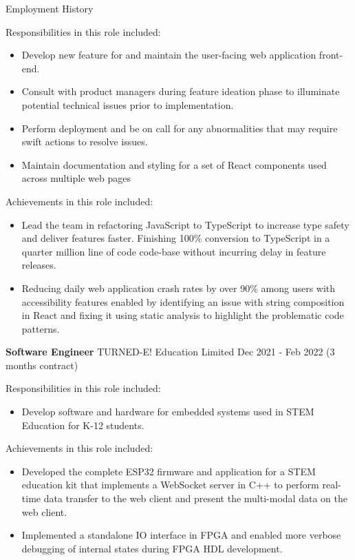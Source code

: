 \documentclass{resume} %
\begin{document}
\begin{rSection}{Employment History}
\begin{minipage}{.8\textwidth}
        Responsibilities in this role included:
        \begin{itemize}
            \item Develop new feature for and maintain the user-facing web application front-end.
            \item Consult with product managers during feature ideation phase to illuminate potential technical issues prior to implementation.
            \item Perform deployment and be on call for any abnormalities that may require swift actions to resolve issues.
            \item Maintain documentation and styling for a set of React components used across multiple web pages
        \end{itemize}
        
        Achievements in this role included:
        \begin{itemize}
            \item Lead the team in refactoring JavaScript to TypeScript to increase type safety and deliver features faster. Finishing 100\% conversion to TypeScript in a quarter million line of code code-base without incurring delay in feature releases.
            \item Reducing daily web application crash rates by over 90\% among users with accessibility features enabled by identifying an issue with string composition in React and fixing it using static analysis to highlight the problematic code patterns.
        \end{itemize}
    \end{minipage}%
    
    \item \textbf{Software Engineer} {TURNED-E! Education Limited} \hfill Dec 2021 - Feb 2022 (3 months contract) \\
    
    \hspace*{1cm}%
    \begin{minipage}{.8\textwidth}%
        
        Responsibilities in this role included:
        \begin{itemize}
            \item Develop software and hardware for embedded systems used in STEM Education for K-12 students.
        \end{itemize}
        
        Achievements in this role included:
        \begin{itemize}
            \item Developed the complete ESP32 firmware and application for a STEM education kit that implements a WebSocket server in C++ to perform real-time data transfer to the web client and present the multi-modal data on the web client.
            \item Implemented a standalone IO interface in FPGA and enabled more verbose debugging of internal states during FPGA HDL development.
        \end{itemize}
    \end{minipage}%
    

\end{rSection}
\end{document}
